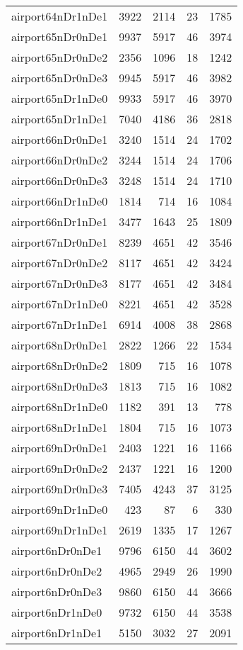 \begin{longtable}{lrrrr}
airport64nDr1nDe1 & 3922 & 2114 & 23 & 1785 \\
airport65nDr0nDe1 & 9937 & 5917 & 46 & 3974 \\
airport65nDr0nDe2 & 2356 & 1096 & 18 & 1242 \\
airport65nDr0nDe3 & 9945 & 5917 & 46 & 3982 \\
airport65nDr1nDe0 & 9933 & 5917 & 46 & 3970 \\
airport65nDr1nDe1 & 7040 & 4186 & 36 & 2818 \\
airport66nDr0nDe1 & 3240 & 1514 & 24 & 1702 \\
airport66nDr0nDe2 & 3244 & 1514 & 24 & 1706 \\
airport66nDr0nDe3 & 3248 & 1514 & 24 & 1710 \\
airport66nDr1nDe0 & 1814 & 714 & 16 & 1084 \\
airport66nDr1nDe1 & 3477 & 1643 & 25 & 1809 \\
airport67nDr0nDe1 & 8239 & 4651 & 42 & 3546 \\
airport67nDr0nDe2 & 8117 & 4651 & 42 & 3424 \\
airport67nDr0nDe3 & 8177 & 4651 & 42 & 3484 \\
airport67nDr1nDe0 & 8221 & 4651 & 42 & 3528 \\
airport67nDr1nDe1 & 6914 & 4008 & 38 & 2868 \\
airport68nDr0nDe1 & 2822 & 1266 & 22 & 1534 \\
airport68nDr0nDe2 & 1809 & 715 & 16 & 1078 \\
airport68nDr0nDe3 & 1813 & 715 & 16 & 1082 \\
airport68nDr1nDe0 & 1182 & 391 & 13 & 778 \\
airport68nDr1nDe1 & 1804 & 715 & 16 & 1073 \\
airport69nDr0nDe1 & 2403 & 1221 & 16 & 1166 \\
airport69nDr0nDe2 & 2437 & 1221 & 16 & 1200 \\
airport69nDr0nDe3 & 7405 & 4243 & 37 & 3125 \\
airport69nDr1nDe0 & 423 & 87 & 6 & 330 \\
airport69nDr1nDe1 & 2619 & 1335 & 17 & 1267 \\
airport6nDr0nDe1 & 9796 & 6150 & 44 & 3602 \\
airport6nDr0nDe2 & 4965 & 2949 & 26 & 1990 \\
airport6nDr0nDe3 & 9860 & 6150 & 44 & 3666 \\
airport6nDr1nDe0 & 9732 & 6150 & 44 & 3538 \\
airport6nDr1nDe1 & 5150 & 3032 & 27 & 2091 \\

\end{longtable}
